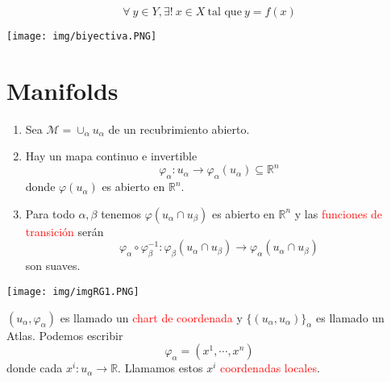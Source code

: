 \documentclass[../main]{subfiles}
\begin{document}
\begin{adjustwidth}{0pt}{-100pt}
\begin{itemize}
\begin{minipage}{0.7\textwidth}
        \begin{equation}
            \forall \ y\in Y, \exists ! \ x\in X \ \text{tal que} \ y=f(x)
        \end{equation}  
    \end{minipage}
    \begin{minipage}{0.5\textwidth}
    \begin{adjustwidth}{0pt}{0pt}
        \begin{center}
            \texttt{[image: img/biyectiva.PNG]}
        \end{center}
    \end{adjustwidth}
    \end{minipage}
\end{itemize}
\section{Manifolds}\label{part1.2}

\begin{enumerate}
    \item Sea $\mathcal{M}=\cup_{\alpha} u_{\alpha}$ de un recubrimiento abierto.
    \item Hay un mapa continuo e invertible
    \begin{equation}
        \varphi_{\alpha}: u_{\alpha} \rightarrow \varphi_{\alpha}(u_{\alpha}) \subseteq \mathbb{R}^n
    \end{equation}
    donde $\varphi(u_{\alpha})$ es abierto en $\mathbb{R}^n$.
    \item Para todo $\alpha, \beta$ tenemos $\varphi(u_{\alpha} \cap u_{\beta})$ es abierto en $\mathbb{R}^n$ y las \textcolor{red}{funciones de transición} serán
    \begin{equation}
        \varphi_{\alpha} \circ \varphi_{\beta}^{-1}: \varphi_{\beta}(u_{\alpha} \cap u_{\beta})\rightarrow \varphi_{\alpha}(u_{\alpha} \cap u_{\beta})
    \end{equation}
    son suaves.
\end{enumerate}

\begin{center}
    \texttt{[image: img/imgRG1.PNG]}
\end{center}
$(u_{\alpha}, \varphi_{\alpha})$ es llamado un \textcolor{red}{chart de coordenada} y $\{(u_{\alpha}, u_{\alpha})\}_{\alpha}$ es llamado un Atlas. Podemos escribir
\begin{equation}
    \varphi_{\alpha}=(x^1, \cdots, x^n)
\end{equation}
donde cada $x^{i}:u_{\alpha}\rightarrow \mathbb{R}$. Llamamos estos $x^{i}$ \textcolor{red}{coordenadas locales}.


\end{adjustwidth}
\end{document}
